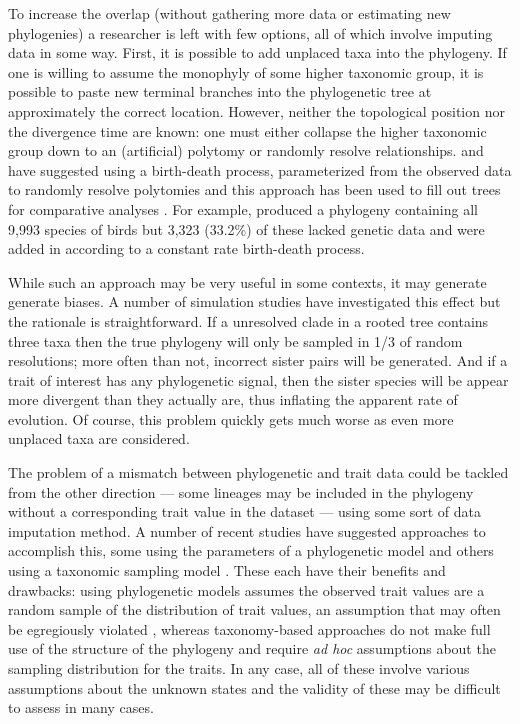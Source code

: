 \documentclass[a4paper,11pt]{article}
\begin{document}
To increase the overlap (without gathering more data or estimating new phylogenies) a researcher is left with few options, all of which involve imputing data in some way. First, it is possible to add unplaced taxa into the phylogeny. If one is willing to assume the monophyly of some higher taxonomic group, it is possible to paste new terminal branches into the phylogenetic tree at approximately the correct location. However, neither the topological position nor the divergence time are known: one must either collapse the higher taxonomic group down to an (artificial) polytomy or randomly resolve relationships. \citet{Kuhn2011} and \citet{ThomasPastis} have suggested using a birth-death process, parameterized from the observed data to randomly resolve polytomies \citep[see also][for a related approach for fossil trees]{Bapst2013} and this approach has been used to fill out trees for comparative analyses \citep{Jetz2012, Price2012, Rolland2014, Jetz2014}. For example, \citet{Jetz2012} produced a phylogeny containing all 9,993 species of birds but 3,323 (33.2\%) of these lacked genetic data and were added in according to a constant rate birth-death process. 

While such an approach may be very useful in some contexts, it may generate generate biases. A number of simulation studies have investigated this effect \citep{Losos1994, Martins1996, Davies2012, Bapst2014, Rabosky2015} but the rationale is straightforward. If a unresolved clade in a rooted tree contains three taxa then the true phylogeny will only be sampled in 1/3 of random resolutions; more often than not, incorrect sister pairs will be generated. And if a trait of interest has any phylogenetic signal, then the sister species will be appear more divergent than they actually are, thus inflating the apparent rate of evolution. Of course, this problem quickly gets much worse as even more unplaced taxa are considered.

The problem of a mismatch between phylogenetic and trait data could be tackled from the other direction --- some lineages may be included in the phylogeny without a corresponding trait value in the dataset --- using some sort of data imputation method. A number of recent studies have suggested approaches to accomplish this, some using the parameters of a phylogenetic model \citep{Fagan2013, PEM, Swenson2014} and others using a taxonomic sampling model \citep{FitzJohn2014, Sandel2015}. These each have their benefits and drawbacks: using phylogenetic models assumes the observed trait values are a random sample of the distribution of trait values, an assumption that may often be egregiously violated \citep{FitzJohn2014}, whereas taxonomy-based approaches do not make full use of the structure of the phylogeny and require \emph{ad hoc} assumptions about the sampling distribution for the traits. In any case, all of these involve various assumptions about the unknown states and the validity of these may be difficult to assess in many cases.
\end{document}
